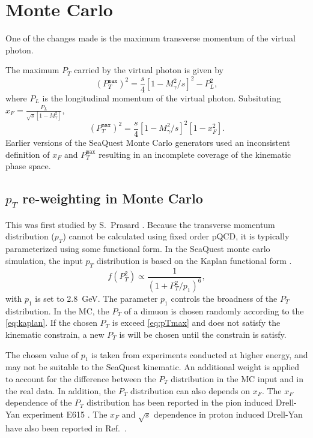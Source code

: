 \documentclass[../main.tex]{subfiles}
\begin{document}
\section{Monte Carlo}
\label{sec:MC}

One of the changes made is the maximum transverse momentum of the virtual photon.

The maximum $P_T$ carried by the virtual photon is given by
\begin{equation}
	\left(P_T^{\mathtt{max}}\right)^2 = \frac{s}{4} \left[1-M^2_\gamma/s\right]^2 - P_L^2,
\end{equation}
where $P_L$ is the longitudinal momentum of the virtual photon.
Subsituting $x_F = \frac{P_L}{\sqrt{s}\left[1-M^2_\gamma\right]}$,
\begin{equation}
	\left(P_T^{\mathtt{max}}\right)^2 = \frac{s}{4} \left[1-M^2_\gamma/s\right]^2\left[1-x_F^2\right].
	\label{eq:pTmax}
\end{equation}
Earlier versions of the SeaQuest Monte Carlo generators used an inconsistent definition of $x_F$
and $P_T^{\mathtt{max}}$ resulting in an incomplete coverage of the kinematic phase space.

\subsection{\texorpdfstring{$p_T$}{pT} re-weighting in Monte Carlo}
This was first studied by S.~Prasard \cite{prasad2020}.
Because the transverse momentum distribution ($p_T$) cannot be calculated using
fixed order pQCD, it is typically parameterized using some functional form.
In the SeaQuest monte carlo simulation, the input $p_T$ distribution is based on the
Kaplan functional form \cite{kaplan1978}.
\begin{equation}
	f\left(P_T^2\right) \propto \frac{1}{\left(1+ P_T^2/p_1\right)^6},
	\label{eq:kaplan}
\end{equation}
with $p_1$ is set to \SI{2.8}{\GeV}. The parameter $p_1$ controls the broadness
of the $P_T$ distribution. In the MC, the $P_T$ of a dimuon is chosen randomly
according to the \cref{eq:kaplan}. If the chosen $P_T$ is exceed \cref{eq:pTmax}
and does not satisfy the kinematic constrain, a new $P_T$ is will be chosen until
the constrain is satisfy.

The chosen value of $p_1$ is taken from experiments conducted at higher
energy, and may not be suitable to the SeaQuest kinematic. An additional weight is
applied to account for the difference between the $P_T$ distribution in the MC input
and in the real data. In addition, the $P_T$ distribution can also depends on $x_F$.
The $x_F$ dependence of the $P_T$ distribution has been reported in the pion induced
Drell-Yan experiment E615 \cite{conway1989}. The $x_F$ and $\sqrt{s}$ dependence in 
proton induced Drell-Yan have also been reported in Ref.~\cite{prasad2020}.
\end{document}

